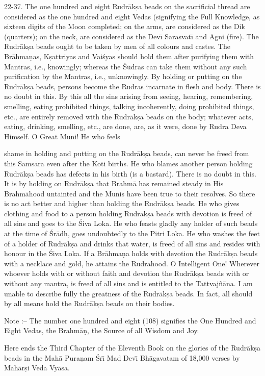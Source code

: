 22-37. The one hundred and eight Rudr\=ak\d{s}a beads on the sacrificial thread are considered as the one hundred and eight Vedas (signifying the Full Knowledge, as sixteen digits of the Moon completed; on the arms, are considered as the Dik (quarters); on the neck, are considered as the Dev\={\i} Sarasvat\={\i} and Agni (fire). The Rudr\=ak\d{s}a beads ought to be taken by men of all colours and castes. The Br\=ahma\d{n}as, K\d{s}attriyas and Vai\'syas should hold them after purifying them with Mantras, i.e., knowingly; whereas the \'S\=udras can take them without any such purification by the Mantras, i.e., unknowingly. By holding or putting on the Rudr\=ak\d{s}a beads, persons become the Rudras incarnate in flesh and body. There is no doubt in this. By this all the sins arising from seeing, hearing, remembering, smelling, eating prohibited things, talking incoherently, doing prohibited things, etc., are entirely removed with the Rudr\=ak\d{s}a beads on the body; whatever acts, eating, drinking, smelling, etc., are done, are, as it were, done by Rudra Deva Himself. O Great Muni! He who feels

shame in holding and putting on the Rudr\=ak\d{s}a beads, can never be freed from this Sams\=ara even after the Koti births. He who blames another person holding Rudr\=ak\d{s}a beads has defects in his birth (is a bastard). There is no doubt in this. It is by holding on Rudr\=ak\d{s}a that Brahm\=a has remained steady in His Brahm\=ahood untainted and the Munis have been true to their resolves. So there is no act better and higher than holding the Rudr\=ak\d{s}a beads. He who gives clothing and food to a person holding Rudr\=ak\d{s}a beads with devotion is freed of all sins and goes to the \'Siva Loka. He who feasts gladly any holder of such beads at the time of \'Sr\=adh, goes undoubtedly to the Pitri Loka. He who washes the feet of a holder of Rudr\=ak\d{s}a and drinks that water, is freed of all sins and resides with honour in the \'Siva Loka. If a Br\=ahma\d{n}a holds with devotion the Rudr\=ak\d{s}a beads with a necklace and gold, he attains the Rudrahood. O Intelligent One! Wherever whoever holds with or without faith and devotion the Rudr\=ak\d{s}a beads with or without any mantra, is freed of all sins and is entitled to the Tattvaj\~n\=ana. I am unable to describe fully the greatness of the Rudr\=ak\d{s}a beads. In fact, all should by all means hold the Rudr\=ak\d{s}a beads on their bodies.

Note :-- The number one hundred and eight (108) signifies the One Hundred and Eight Vedas, the Brahm\=a\d{n}, the Source of all Wisdom and Joy.

Here ends the Third Chapter of the Eleventh Book on the glories of the Rudr\=ak\d{s}a beads in the Mah\=a Pura\d{n}am \'Sr\={\i} Mad Dev\={\i} Bh\=agavatam of 18,000 verses by Mah\=ar\d{s}i Veda Vy\=asa.



